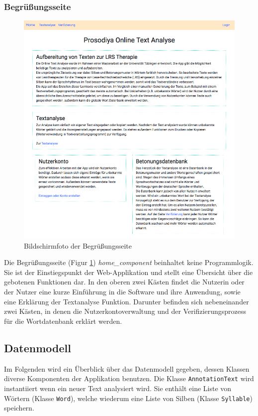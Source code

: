 \subsubsection{Begrüßungsseite}

\begin{figure}[h!]
	\centering
	\includegraphics[width=.6\linewidth, frame]{figures/frontend/home}
	\caption{Bildschirmfoto der Begrüßungsseite}
	\label{fig:frontend-home}
\end{figure}

Die Begrüßungsseite (Figur \ref{fig:frontend-home}) \textit{home\_component} beinhaltet keine Programmlogik. Sie ist der Einstiegspunkt der Web-Applikation und stellt eine Übersicht über die gebotenen Funktionen dar. In den oberen zwei Kästen findet die Nutzerin oder der Nutzer eine kurze Einführung in die Software und ihre Anwendung, sowie eine Erklärung der Textanalyse Funktion. Darunter befinden sich nebeneinander zwei Kästen, in denen die Nutzerkontoverwaltung und der Verifizierungsprozess für die Wortdatenbank erklärt werden.

\subsection{Datenmodell}

Im Folgenden wird ein Überblick über das Datenmodell gegeben, dessen Klassen diverse Komponenten der Applikation benutzen. Die Klasse \texttt{AnnotationText} wird instantiiert wenn ein neuer Text analysiert wird. Sie
enthält eine Liste von Wörtern (Klasse \texttt{Word}), welche wiederum eine Liste von Silben (Klasse \texttt{Syllable}) speichern. \\


